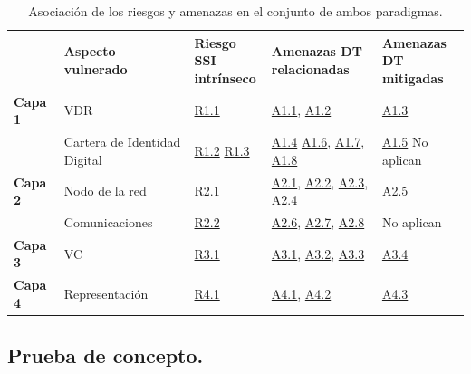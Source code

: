 \documentclass[../main.tex]{subfiles}
\begin{document}
\setlength{\tabcolsep}{0.5em} 
\renewcommand{\arraystretch}{1.5}
\begin{table}[h!]
    \begin{tabular}{|p{1.5cm}||p{3cm}|p{2.5cm}|p{3.8cm}|p{3cm}|}
        \hline
        & 
        \textbf{Aspecto \newline vulnerado} & 
        \textbf{Riesgo \acrshort{SSI} \newline intrínseco} & 
        \textbf{Amenazas \acrshort{DT} \newline relacionadas} &
        \textbf{Amenazas \acrshort{DT} \newline mitigadas} \\
        \hline\hline
        
        \textbf{Capa 1} & 
        \acrshort{VDR} & 
        \hyperref[R1.1]{R1.1} &
        \hyperref[A1.1]{A1.1}, \hyperref[A1.2]{A1.2} &
        \hyperref[A1.3]{A1.3}  \\
        \cline{2-5} & 
        Cartera de \newline Identidad Digital  & 
        \hyperref[R1.2]{R1.2} \newline \hyperref[R1.3]{R1.3} & 
        \hyperref[A1.4]{A1.4} \newline \hyperref[A1.6]{A1.6}, \hyperref[A1.7]{A1.7}, \hyperref[A1.8]{A1.8} &
        \hyperref[A1.5]{A1.5} \newline No aplican \\
        \hline
        
        \textbf{Capa 2} & 
        Nodo de la red & 
        \hyperref[R2.1]{R2.1}  & 
        \hyperref[A2.1]{A2.1}, \hyperref[A2.2]{A2.2}, \hyperref[A2.3]{A2.3}, \hyperref[A2.4]{A2.4} &
        \hyperref[A2.5]{A2.5} \\
        \cline{2-5} & 
        Comunicaciones & 
        \hyperref[R2.2]{R2.2}  & 
        \hyperref[A2.6]{A2.6}, \hyperref[A2.7]{A2.7}, \hyperref[A2.8]{A2.8} &
        No aplican \\
        \hline
        
        \textbf{Capa 3} & 
        \acrshort{VC} & 
        \hyperref[R3.1]{R3.1} &  
        \hyperref[A3.1]{A3.1}, \hyperref[A3.2]{A3.2}, \hyperref[A3.3]{A3.3} &
        \hyperref[A3.4]{A3.4} \\
        \hline
        
        \textbf{Capa 4} & 
        Representación & 
        \hyperref[R4.1]{R4.1} & 
        \hyperref[A4.1]{A4.1}, \hyperref[A4.2]{A4.2} &
        \hyperref[A4.3]{A4.3} \\
        \hline
    
    \end{tabular}
 \caption{Asociación de los riesgos y amenazas en el conjunto de ambos paradigmas.}
 \label{tabla_amenazas}
\end{table}


\newpage
\subsection{Prueba de concepto.}\label{Prueba de concepto}

\end{document}
